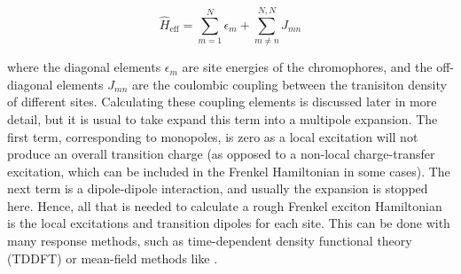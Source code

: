\begin{equation}
\hat{H}_{\text{eff}} = \sum^N_{m=1} \epsilon_m + \sum^{N,N}_{m \neq n} J_{mn}
\end{equation}

where the diagonal elements $\epsilon_m$ are site energies of the chromophores, 
and the off-diagonal elements $J_{mn}$ are the coulombic coupling between the tranisiton
density of different sites. Calculating these coupling elements is discussed later
in more detail, but it is usual to take expand this term into a multipole expansion\cite{Steinmann2015}. 
The first term, corresponding to monopoles, is zero as a local excitation will not 
produce an overall transition charge (as opposed to a non-local charge-transfer 
excitation, which can be included in the Frenkel Hamiltonian in some cases\cite{Li2017}). 
The next term is a dipole-dipole interaction, and usually the expansion is stopped 
here. Hence, all that is needed to calculate a rough Frenkel exciton Hamiltonian 
is the local excitations and transition dipoles for each site. This can be done 
with many response methods, such as time-dependent density functional theory (TDDFT) 
or mean-field methods like \dscf.


